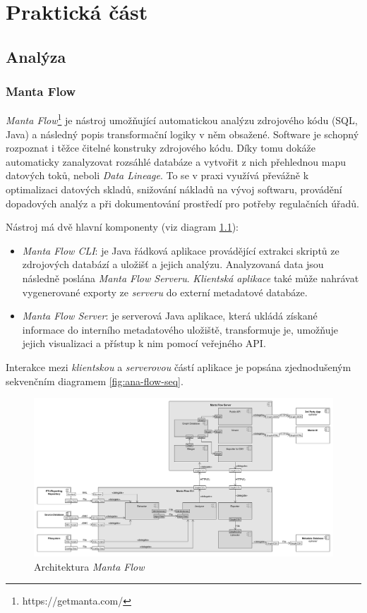 \chapter{Praktická část}

\section{Analýza}

\subsection{Manta Flow}
\textit{Manta Flow}\footnote{https://getmanta.com/} je nástroj umožňující automatickou analýzu zdrojového kódu (SQL, Java) a následný popis transformační logiky v něm obsažené. Software je schopný rozpoznat i těžce čitelné konstruky zdrojového kódu. Díky tomu dokáže automaticky zanalyzovat rozsáhlé databáze a vytvořit z nich přehlednou mapu datových toků, neboli \textit{Data Lineage}. To se v praxi využívá převážně k optimalizaci datových skladů, snižování nákladů na vývoj softwaru, provádění dopadových analýz a při dokumentování prostředí pro potřeby regulačních úřadů.

Nástroj má dvě hlavní komponenty (viz diagram \ref{fig:ana-flow-comp}): 
\begin{itemize}
	\item{\textit{Manta Flow CLI}}: je Java řádková aplikace provádějící extrakci skriptů ze zdrojových databází a uložišť a jejich analýzu. Analyzovaná data jsou následně poslána \textit{Manta Flow Serveru}. \textit{Klientská aplikace} také může nahrávat vygenerované exporty ze \textit{serveru} do externí metadatové databáze. 
	\item{\textit{Manta Flow Server}}: je serverová Java aplikace, která ukládá získané informace do interního metadatového uložiště, transformuje je, umožňuje jejich visualizaci a přístup k nim pomocí veřejného API. 
\end{itemize}

Interakce mezi \textit{klientskou} a \textit{serverovou} částí aplikace je popsána zjednodušeným sekvenčním diagramem \ref{fig:ana-flow-seq}. 

\begin{figure}
\begin{center}
\includegraphics[width=14cm]{figures/flow_comp}
\caption{Architektura \textit{Manta Flow}}
\label{fig:ana-flow-comp}
\end{center}
\end{figure}

